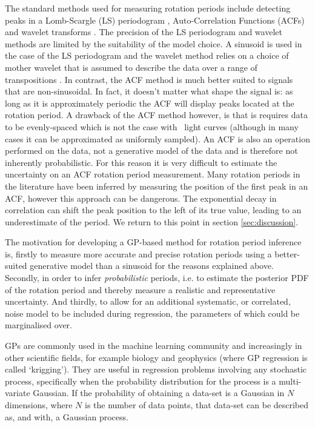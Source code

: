 The standard methods used for measuring rotation periods include detecting
peaks in a Lomb-Scargle \citep{Lomb1976, Scargle1982} (LS) periodogram
\citep[e.g.][]{Reinhold2013}, Auto-Correlation Functions (ACFs)
\citep{Mcquillan2013} and wavelet transforms \citep{Garcia2014}.
The precision of the LS periodogram and wavelet methods are limited by the
suitability of the model choice.
A sinusoid is used in the case of the LS periodogram and the wavelet method
relies on a choice of mother wavelet that is assumed to describe the data over
a range of transpositions \citep[see, \eg][]{Carter2010}.
In contrast, the ACF method is much better suited to signals that are
non-sinusoidal.
In fact, it doesn't matter what shape the signal is: as long as it is
approximately periodic the ACF will display peaks located at the rotation
period.
A drawback of the ACF method however, is that is requires data to be
evenly-spaced which is not the case with \Kepler\ light curves (although in
many cases it can be approximated as uniformly sampled).
An ACF is also an operation performed on the data, not a generative model of
the data and is therefore not inherently probabilistic.
For this reason it is very difficult to estimate the uncertainty on an ACF
rotation period measurement.
Many rotation periods in the literature have been inferred by measuring the
position of the first peak in an ACF, however this approach can be dangerous.
The exponential decay in correlation can shift the peak position to the left
of its true value, leading to an underestimate of the period.
We return to this point in section \textsection \ref{sec:discussion}.

The motivation for developing a GP-based method for rotation period inference
is, firstly to measure more accurate and precise rotation periods using a
better-suited generative model than a sinusoid for the reasons explained
above.
Secondly, in order to infer {\it probabilistic} periods, i.e. to estimate the
posterior PDF of the rotation period and thereby measure a realistic and
representative uncertainty.
And thirdly, to allow for an additional systematic, or correlated, noise model
to be included during regression, the parameters of which could be
marginalised over.

GPs are commonly used in the machine learning community and increasingly
in other scientific fields, for example biology and geophysics (where GP
regression is called `krigging').
They are useful in regression problems involving any stochastic process,
specifically when the probability distribution for the process is a
multi-variate Gaussian.
If the probability of obtaining a data-set is a Gaussian in $N$ dimensions,
where $N$ is the number of data points, that data-set can be described as, and
with, a Gaussian process.


